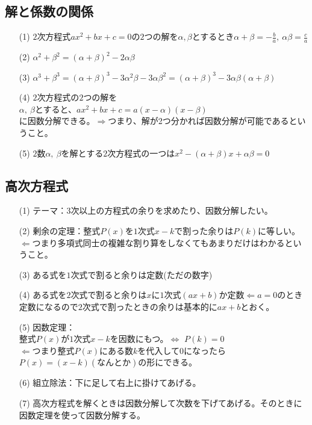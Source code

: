 \documentclass[twocolumn, 20pt]{jarticle}
\begin{document}
\subsection*{解と係数の関係}
\begin{itemize}
  \item[(1)]$2$次方程式$ax^2+bx+c=0$の$2$つの解を$\alpha,\beta$とするとき{\Large{$\displaystyle\alpha + \beta = -\frac{b}{a},\ \alpha\beta=\frac{c}{a}$}}
  \item[(2)]$\alpha^2+\beta^2 = (\alpha + \beta)^2 - 2\alpha\beta$
  \item[(3)]$\alpha^3 + \beta^3 = (\alpha + \beta)^3 - 3\alpha^2 \beta -3\alpha\beta^2 = (\alpha + \beta)^3 - 3\alpha\beta(\alpha+\beta)$
  \item[(4)]$2$次方程式の$2$つの解を\\$\alpha,\ \beta$とすると、$ax^2 + bx + c=a(x-\alpha)(x-\beta)$\\に因数分解できる。$\Rightarrow$つまり、解が2つ分かれば因数分解が可能であるということ。
  \item[(5)]$2$数$\alpha,\ \beta$を解とする$2$次方程式の一つは$x^2 - (\alpha + \beta)x +\alpha\beta=0$
\end{itemize}
\subsection*{高次方程式}
\begin{itemize}
  \item[(1)]テーマ：$3$次以上の方程式の余りを求めたり、因数分解したい。
  \item[(2)]{\Large{剰余の定理：整式$P(x)$を$1$次式$x-k$で割った余りは$P(k)$に等しい。}}$\Leftarrow$つまり多項式同士の複雑な割り算をしなくてもあまりだけはわかるということ。
  \item[(3)]ある式を$1$次式で割ると余りは定数(ただの数字)
  \item[(4)]ある式を$2$次式で割ると余りは$x$に$1$次式$(ax+b)$か定数$\Leftarrow$$a=0$のとき定数になるので$2$次式で割ったときの余りは基本的に{\LARGE{$ax+b$}}とおく。
  \item[(5)]因数定理：\\整式$P(x)$が$1$次式$x-k$を因数にもつ。$\Leftrightarrow$ $P(k)=0$\\$\Leftarrow$つまり整式$P(x)$にある数$k$を代入して$0$になったら$P(x)= (x-k)(なんとか)$の形にできる。
  \item[(6)]組立除法：下に足して右上に掛けてあげる。
  \item[(7)]高次方程式を解くときは因数分解して次数を下げてあげる。そのときに因数定理を使って因数分解する。
\end{itemize}
\end{document}
